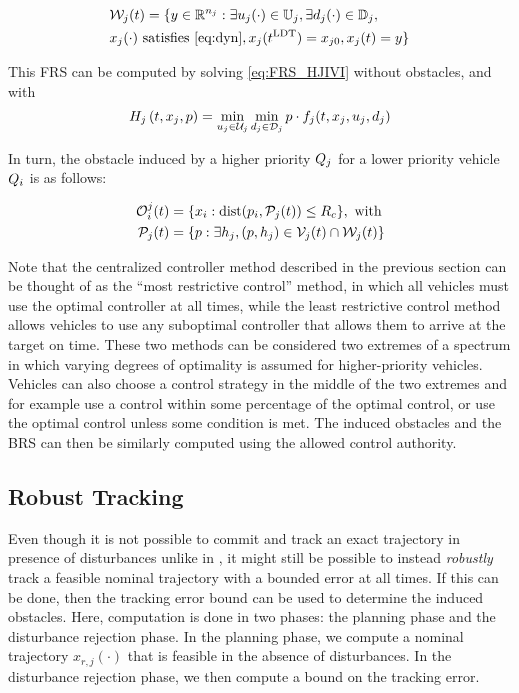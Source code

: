 \begin{equation}
\label{eq:FRS2}
\begin{aligned}
&\frs_j(t) = \{y \in \R^{n_j}: \exists u_j(\cdot)\in\cfset_j, \exists d_j(\cdot) \in \dfset_j, \\
&x_j(\cdot) \text{ satisfies \eqref{eq:dyn}}, x_j(\ldt) = x_{j0}, x_j(t) = y\}
\end{aligned}
\end{equation}

This FRS can be computed by solving \eqref{eq:FRS_HJIVI} without obstacles, and with
\vspace{-0.4em}
\begin{equation}
H_j\left(t, x_j, p\right) = \min_{u_j \in \mathcal{U}_j} \min_{d_j \in \mathcal{D}_j} p \cdot f_j(t, x_j, u_j, d_j)
\end{equation}

In turn, the obstacle induced by a higher priority $Q_{j}$ for a lower priority vehicle $Q_{i}$ is as follows:

\begin{equation}
\begin{aligned}
\mathcal{O}_i^j(t) &= \{x_i: \text{dist}(p_i, \mathcal{P}_j(t)) \le R_c \}, \text{ with} \\
\mathcal{P}_j(t) &= \{p: \exists h_j, (p, h_j) \in \mathcal{V}_j(t) \cap \mathcal{W}_j(t)\}
\end{aligned}
\end{equation}

Note that the centralized controller method described in the previous section can be thought of as the ``most restrictive control'' method, in which all vehicles must use the optimal controller at all times, while the least restrictive control method allows vehicles to use any suboptimal controller that allows them to arrive at the target on time. These two methods can be considered two extremes of a spectrum in which varying degrees of optimality is assumed for higher-priority vehicles. Vehicles can also choose a control strategy in the middle of the two extremes and for example use a control within some percentage of the optimal control, or use the optimal control unless some condition is met. The induced obstacles and the BRS can then be similarly computed using the allowed control authority.

\subsection{Robust Tracking} \label{sec:incomp_robust}
Even though it is not possible to commit and track an exact trajectory in presence of disturbances unlike in \cite{Chen15}, it might still be possible to instead \textit{robustly} track a feasible nominal trajectory with a bounded error at all times. If this can be done, then the tracking error bound can be used to determine the induced obstacles. Here, computation is done in two phases: the planning phase and the disturbance rejection phase. In the planning phase, we compute a nominal trajectory $x_{r,j}(\cdot)$ that is feasible in the absence of disturbances. In the disturbance rejection phase, we then compute a bound on the tracking error.

